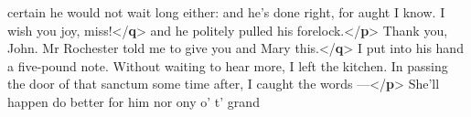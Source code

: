 \documentclass[11pt,twoside]{article}\makeatletter
\begin{document}
\begin{shaded}
\hspace*{6pt}\hspace*{6pt}\hspace*{6pt}\hspace*{6pt} certain he would not wait long either: and he's done right,\mbox{}\newline 
\hspace*{6pt}\hspace*{6pt}\hspace*{6pt}\hspace*{6pt} for aught I know. I wish you joy, miss!{</\textbf{q}>} and he politely\mbox{}\newline 
\hspace*{6pt}\hspace*{6pt} pulled his forelock.{</\textbf{p}>}\mbox{}\newline 
{}\mbox{}\newline 
\hspace*{6pt}Thank you, John. Mr Rochester told me to give you and\mbox{}\newline 
\hspace*{6pt}\hspace*{6pt}\hspace*{6pt}\hspace*{6pt} Mary this.{</\textbf{q}>}\mbox{}\newline 
{}\mbox{}\newline 
{}I put into his hand a five-pound note. Without waiting\mbox{}\newline 
\hspace*{6pt}\hspace*{6pt} to hear more, I left the kitchen. In passing the door of\mbox{}\newline 
\hspace*{6pt}\hspace*{6pt} that sanctum some time after, I caught the words —{</\textbf{p}>}\mbox{}\newline 
{}\mbox{}\newline 
\hspace*{6pt}She'll happen do better for him nor ony o' t' grand\mbox{}\newline 

\end{shaded}
\end{document}

